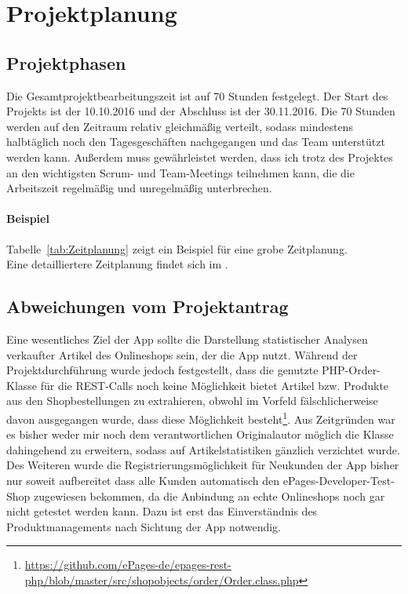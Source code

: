 \section{Projektplanung} 
\label{sec:Projektplanung}


\subsection{Projektphasen}
\label{sec:Projektphasen}

Die Gesamtprojektbearbeitungszeit ist auf 70 Stunden festgelegt. Der Start des Projekts ist der 10.10.2016 und der Abschluss ist der 30.11.2016. Die 70 Stunden werden auf den Zeitraum relativ gleichmäßig verteilt, sodass mindestens halbtäglich noch den Tagesgeschäften nachgegangen und das Team unterstützt werden kann. Außerdem muss gewährleistet werden, dass ich trotz des Projektes an den wichtigsten Scrum- und Team-Meetings teilnehmen kann, die die Arbeitszeit regelmäßig und unregelmäßig unterbrechen.

\paragraph{Beispiel}
Tabelle~\ref{tab:Zeitplanung} zeigt ein Beispiel für eine grobe Zeitplanung.
\\
Eine detailliertere Zeitplanung findet sich im .


\subsection{Abweichungen vom Projektantrag}
\label{sec:AbweichungenProjektantrag}

Eine wesentliches Ziel der App sollte die Darstellung statistischer Analysen verkaufter Artikel des Onlineshops sein, der die App nutzt. Während der Projektdurchführung wurde jedoch festgestellt, dass die genutzte PHP-Order-Klasse für die REST-Calls noch keine Möglichkeit bietet Artikel bzw. Produkte aus den Shopbestellungen zu extrahieren, obwohl im Vorfeld fälschlicherweise davon ausgegangen wurde, dass diese Möglichkeit besteht\footnote{\url{https://github.com/ePages-de/epages-rest-php/blob/master/src/shopobjects/order/Order.class.php}}. Aus Zeitgründen war es bisher weder mir noch dem verantwortlichen Originalautor möglich die Klasse dahingehend zu erweitern, sodass auf Artikelstatistiken gänzlich verzichtet wurde. Des Weiteren wurde die Registrierungsmöglichkeit für Neukunden der App bisher nur soweit aufbereitet dass alle Kunden automatisch den ePages-Developer-Test-Shop zugewiesen bekommen, da die Anbindung an echte Onlineshops noch gar nicht getestet werden kann. Dazu ist erst das Einverständnis des Produktmanagements nach Sichtung der App notwendig. 



